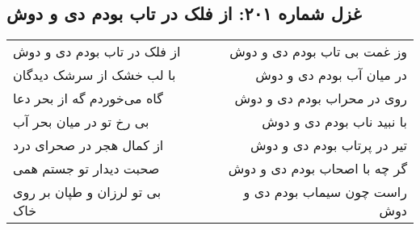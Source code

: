 \begin{center}
\section*{غزل شماره ۲۰۱: از فلک در تاب بودم دی و دوش}
\label{sec:201}
\begin{longtable}{l p{0.5cm} r}
از فلک در تاب بودم دی و دوش
&&
وز غمت بی تاب بودم دی و دوش
\\
با لب خشک از سرشک دیدگان
&&
در میان آب بودم دی و دوش
\\
گاه می‌خوردم گه از بحر دعا
&&
روی در محراب بودم دی و دوش
\\
بی رخ تو در میان بحر آب
&&
با نبید ناب بودم دی و دوش
\\
از کمال هجر در صحرای درد
&&
تیر در پرتاب بودم دی و دوش
\\
صحبت دیدار تو جستم همی
&&
گر چه با اصحاب بودم دی و دوش
\\
بی تو لرزان و طپان بر روی خاک
&&
راست چون سیماب بودم دی و دوش
\\
\end{longtable}
\end{center}

